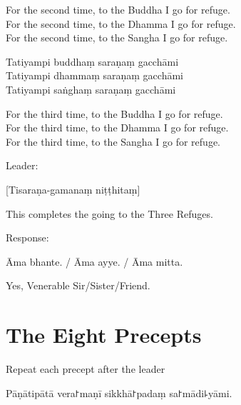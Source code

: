 \begin{english}
  For the second time, to the Buddha I go for refuge.\\
  For the second time, to the Dhamma I go for refuge.\\
  For the second time, to the Sangha I go for refuge.
\end{english}

Tatiyampi buddhaṃ saraṇaṃ gacchāmi\\
Tatiyampi dhammaṃ saraṇaṃ gacchāmi\\
Tatiyampi saṅghaṃ saraṇaṃ gacchāmi

\clearpage

\begin{english}
  For the third time, to the Buddha I go for refuge.\\
  For the third time, to the Dhamma I go for refuge.\\
  For the third time, to the Sangha I go for refuge.
\end{english}

\begin{instruction}
  Leader:
\end{instruction}

[Tisaraṇa-gamanaṃ niṭṭhitaṃ]

\begin{english}
  This completes the going to the Three Refuges.
\end{english}

\begin{instruction}
  Response:
\end{instruction}

Āma bhante. / Āma ayye. / Āma mitta.

\begin{english}
  Yes, Venerable Sir/Sister/Friend.
\end{english}

\chapter{The Eight Precepts}%

\begin{instruction}
  Repeat each precept after the leader
\end{instruction}

\begin{precept}
  \setcounter{enumi}{0}
  \item Pāṇātipātā vera꜓maṇī sikkhā꜓padaṃ sa꜓mādi꜕yāmi.
\end{precept}

